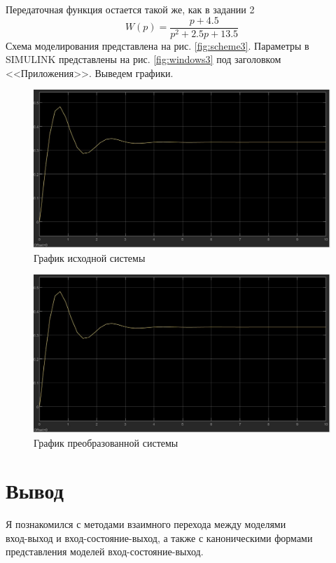 \documentclass[a4paper, 12pt]{article}
\begin{document}
    Передаточная функция остается такой же, как в задании 2
    $$W(p)=\dfrac{p+4.5}{p^2+2.5p+13.5}$$
    Схема моделирования представлена на рис. \ref{fig:scheme3}.
    Параметры в SIMULINK представлены на рис. \ref{fig:windows3} под заголовком <<Приложения>>. Выведем графики.
    \begin{figure}[H]
        \centering
        \includegraphics[scale=0.3]{model_3.jpg}
        \captionsetup{skip=0pt}
        \caption{График исходной системы}
        \label{fig:m3}
    \end{figure}
    \begin{figure}[H]
        \centering
        \includegraphics[scale=0.3]{new_model_3.jpg}
        \captionsetup{skip=0pt}
        \caption{График преобразованной системы}
        \label{fig:nm3}
    \end{figure}


    \section{Вывод}
    Я познакомился с методами взаимного перехода между моделями \\
    вход-выход и вход-состояние-выход, а также с каноническими формами представления
    моделей вход-состояние-выход.
    
\end{document}
